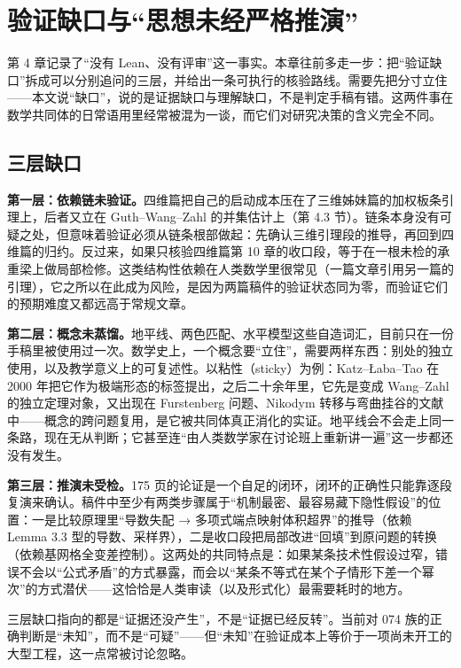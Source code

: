 \section{验证缺口与“思想未经严格推演”}

第 4 章记录了“没有 Lean、没有评审”这一事实。本章往前多走一步：把“验证缺口”拆成可以分别追问的三层，并给出一条可执行的核验路线。需要先把分寸立住——本文说“缺口”，说的是证据缺口与理解缺口，不是判定手稿有错。这两件事在数学共同体的日常语用里经常被混为一谈，而它们对研究决策的含义完全不同。

\subsection{三层缺口}

\textbf{第一层：依赖链未验证。}四维篇把自己的启动成本压在了三维姊妹篇的加权板条引理上，后者又立在 Guth--Wang--Zahl 的并集估计上（第 4.3 节）。链条本身没有可疑之处，但意味着验证必须从链条根部做起：先确认三维引理段的推导，再回到四维篇的归约。反过来，如果只核验四维篇第 10 章的收口段，等于在一根未检的承重梁上做局部检修。这类结构性依赖在人类数学里很常见（一篇文章引用另一篇的引理），它之所以在此成为风险，是因为两篇稿件的验证状态同为零，而验证它们的预期难度又都远高于常规文章。

\textbf{第二层：概念未蒸馏。}地平线、两色匹配、水平模型这些自造词汇，目前只在一份手稿里被使用过一次。数学史上，一个概念要“立住”，需要两样东西：别处的独立使用，以及教学意义上的可复述性。以粘性（sticky）为例：Katz--\L aba--Tao 在 2000 年把它作为极端形态的标签提出，之后二十余年里，它先是变成 Wang--Zahl 的独立定理对象，又出现在 Furstenberg 问题、Nikodym 转移与弯曲挂谷的文献中——概念的跨问题复用，是它被共同体真正消化的实证。地平线会不会走上同一条路，现在无从判断；它甚至连“由人类数学家在讨论班上重新讲一遍”这一步都还没有发生。

\textbf{第三层：推演未受检。}175 页的论证是一个自足的闭环，闭环的正确性只能靠逐段复演来确认。稿件中至少有两类步骤属于“机制最密、最容易藏下隐性假设”的位置：一是比较原理里“导数失配 → 多项式端点映射体积超界”的推导（依赖 Lem\-ma 3.3 型的导数、采样界），二是收口段把局部改进“回填”到原问题的转换（依赖基网格全变差控制）。这两处的共同特点是：如果某条技术性假设过窄，错误不会以“公式矛盾”的方式暴露，而会以“某条不等式在某个子情形下差一个幂次”的方式潜伏——这恰恰是人类审读（以及形式化）最需要耗时的地方。

\begin{keybox}[三层缺口的共同点]
三层缺口指向的都是“证据还没产生”，不是“证据已经反转”。当前对 074 族的正确判断是“未知”，而不是“可疑”——但“未知”在验证成本上等价于一项尚未开工的大型工程，这一点常被讨论忽略。
\end{keybox}

